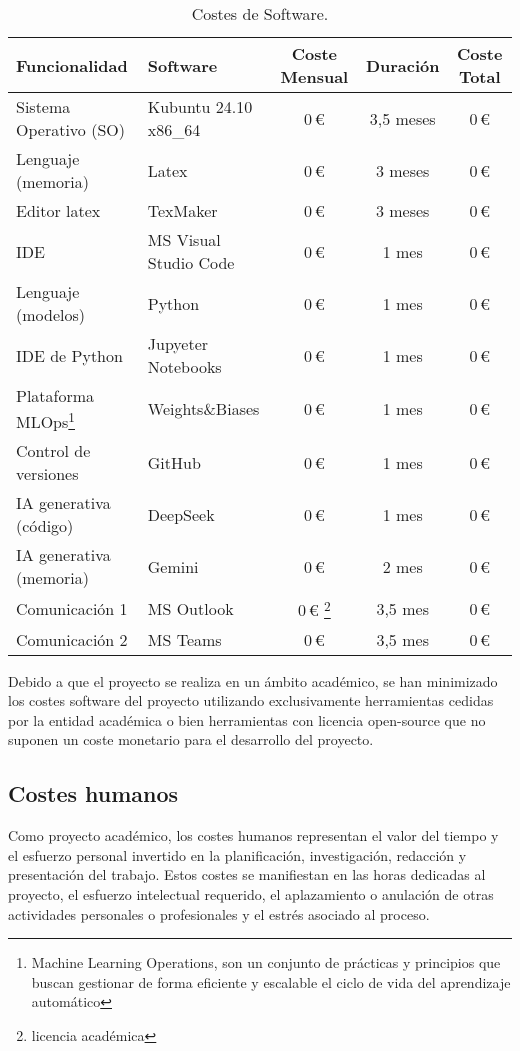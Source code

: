 \begin{table}[H]
\centering
\begin{tabular}{|l|l|c|c|c|}
\toprule
Funcionalidad & Software & Coste Mensual & Duración & Coste Total \\
\midrule
Sistema Operativo (SO) & Kubuntu 24.10 x86\_64  & 0\,€  & 3,5 meses & 0\,€ \\
Lenguaje (memoria) & Latex &  0\,€ & 3 meses & 0\,€ \\
Editor latex & TexMaker & 0\,€ & 3 meses & 0\,€ \\
IDE  & MS Visual Studio Code & 0\,€ & 1 mes & 0\,€ \\
Lenguaje (modelos) & Python & 0\,€ & 1 mes & 0\,€ \\
IDE de Python & Jupyeter Notebooks & 0\,€ & 1 mes & 0\,€ \\
Plataforma MLOps\footnote{Machine Learning Operations, son un conjunto de prácticas y principios que buscan gestionar de forma eficiente y escalable el ciclo de vida del aprendizaje automático} & Weights\&Biases & 0\,€ & 1 mes & 0\,€ \\
Control de versiones & GitHub & 0\,€ & 1 mes & 0\,€ \\
IA generativa (código) & DeepSeek & 0\,€ & 1 mes & 0\,€ \\
IA generativa (memoria) & Gemini & 0\,€ & 2 mes & 0\,€ \\
Comunicación 1 & MS Outlook & 0\,€ \footnote{licencia académica} & 3,5 mes & 0\,€ \\
Comunicación 2 & MS Teams & 0\,€ & 3,5 mes & 0\,€ \\
\bottomrule
\end{tabular}
\caption{Costes de Software.}
\label{tab:costes_software}
\end{table}

Debido a que el proyecto se realiza en un ámbito académico, se han minimizado los costes software del proyecto utilizando exclusivamente herramientas cedidas por la entidad académica o bien herramientas con licencia open-source que no suponen un coste monetario para el desarrollo del proyecto. 


\subsection{Costes humanos} \label{subsec.costeshumanos}
Como proyecto académico, los costes humanos representan el valor del tiempo y el esfuerzo personal invertido en la planificación, investigación, redacción y presentación del trabajo. Estos costes se manifiestan en las horas dedicadas al proyecto, el esfuerzo intelectual requerido, el aplazamiento o anulación de otras actividades personales o profesionales y el estrés asociado al proceso.

